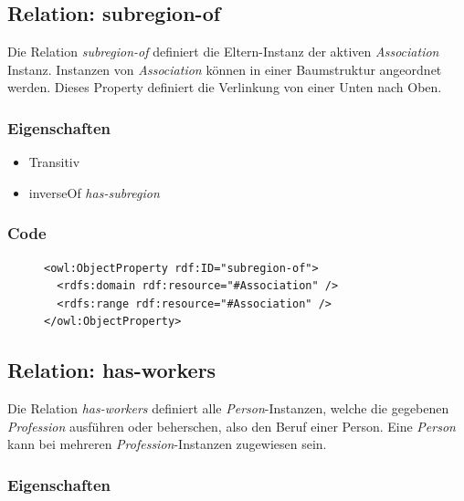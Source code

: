\documentclass[
    11pt,
    latin1,
    a4paper,
    oneside
]{scrreprt}
\begin{document}
\subsection{Relation: subregion-of} \label{sec:rel_subregionof}

Die Relation \emph{subregion-of} definiert die Eltern-Instanz der aktiven \emph{Association} Instanz. Instanzen von \emph{Association} k\"onnen in einer Baumstruktur angeordnet werden. Dieses Property definiert die Verlinkung von einer Unten nach Oben.

\subsubsection{Eigenschaften} \label{sec:rel_subregionof_settings}

\begin{itemize}
  \item Transitiv
  \item inverseOf \emph{has-subregion}
\end{itemize}

\subsubsection{Code} \label{sec:rel_subregionof_code}

\begin{figure}[H]
 \lstset{language=XML}
 \begin{lstlisting}[label=owl:subregionof,caption={Die Relation \emph{subregion-of} definiert die \"ubergeordnete \emph{Association}}]
<owl:ObjectProperty rdf:ID="subregion-of">
  <rdfs:domain rdf:resource="#Association" />
  <rdfs:range rdf:resource="#Association" />
</owl:ObjectProperty>
 \end{lstlisting}
\end{figure}


\subsection{Relation: has-workers} \label{sec:rel_hasworkers}

Die Relation \emph{has-workers} definiert alle \emph{Person}-Instanzen, welche die gegebenen \emph{Profession} ausf\"uhren oder beherschen, also den Beruf einer Person. Eine \emph{Person} kann bei mehreren \emph{Profession}-Instanzen zugewiesen sein.

\subsubsection{Eigenschaften} \label{sec:rel_hasworkers_settings}
\end{document}
